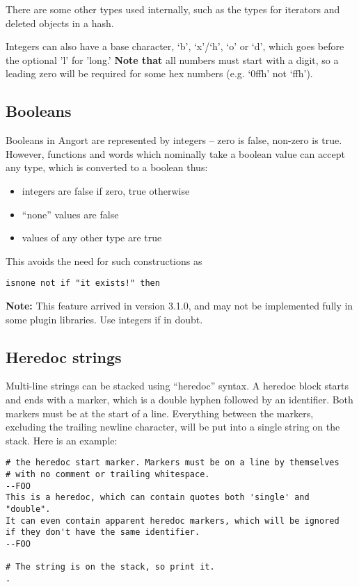 There are some other types used internally, such as the
types for iterators and deleted objects in a hash.

Integers can also have a base character, `b', `x'/`h', `o' or `d', which
goes before the optional 'l' for 'long.' \textbf{Note that} all numbers
must start with a digit, so a leading zero will be required for some 
hex numbers (e.g. `0ffh' not `ffh').

\subsection{Booleans}
Booleans in Angort are represented by integers -- zero is false, non-zero
is true. However, functions and words which nominally take a boolean value can
accept any type, which is converted to a boolean thus:
\begin{itemize}
\item integers are false if zero, true otherwise
\item ``none'' values are false
\item values of any other type are true
\end{itemize}
This avoids the need for such constructions as
\begin{lstlisting}
isnone not if "it exists!" then
\end{lstlisting}
\textbf{Note:} This feature arrived in version 3.1.0, and may not
be implemented fully in some plugin libraries. Use integers if in doubt.

\subsection{Heredoc strings}
Multi-line strings can be stacked 
using ``heredoc'' syntax. A heredoc block starts and ends with a marker,
which is a double hyphen followed by an identifier. Both markers
must be at the start of a line. Everything between
the markers, excluding the trailing newline character, will be put into
a single string on the stack. Here is an example:
\begin{lstlisting}
# the heredoc start marker. Markers must be on a line by themselves
# with no comment or trailing whitespace.
--FOO
This is a heredoc, which can contain quotes both 'single' and "double".
It can even contain apparent heredoc markers, which will be ignored
if they don't have the same identifier.
--FOO

# The string is on the stack, so print it.
.
\end{lstlisting}

